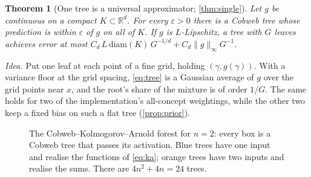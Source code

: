 \documentclass[11pt]{article}
\newtheorem{theorem}{Theorem}
\theoremstyle{definition}
\theoremstyle{remark}
\newcommand{\R}{\mathbb{R}}
\begin{document}
\begin{theorem}[One tree is a universal approximator; \cref{thm:single}]\label{thm:main-single}
Let $g$ be continuous on a compact $K\subset\R^d$.  For every $\varepsilon>0$ there is a
Cobweb tree whose prediction is within $\varepsilon$ of $g$ on all of $K$.  If $g$ is
$L$-Lipschitz, a tree with $G$ leaves achieves error at most
$C_d\,L\,\mathrm{diam}(K)\,G^{-1/d}+C_d\|g\|_\infty G^{-1}$.
\end{theorem}

\emph{Idea.}  Put one leaf at each point of a fine grid, holding $(\gamma,g(\gamma))$.
With a variance floor at the grid spacing, \eqref{eq:tree} is a Gaussian average of
$g$ over the grid points near $x$, and the root's share of the mixture is of order $1/G$.
The same holds for two of the implementation's all-concept weightings, while the other
two keep a fixed bias on such a flat tree (\cref{prop:prior}).

\begin{figure}[t]
\centering
{}
\caption{The Cobweb--Kolmogorov--Arnold forest for $n=2$: every box is a Cobweb tree that
passes its activation.  Blue trees have one input and realise the functions of
\eqref{eq:ka}; orange trees have two inputs and realise the sums.  There are
$4n^2+4n=24$ trees.}
\label{fig:cka}
\end{figure}
\end{document}
